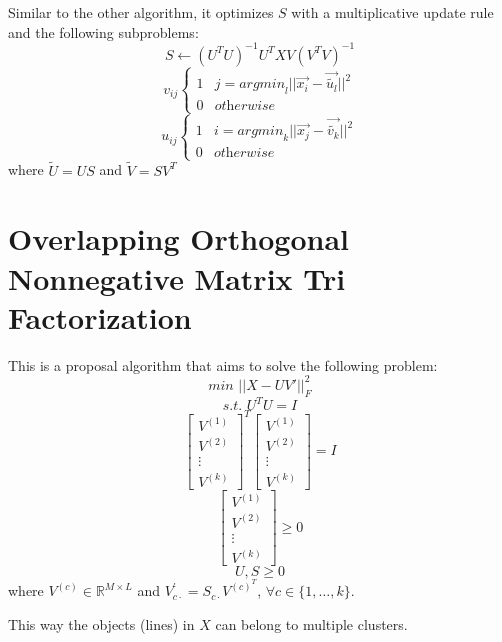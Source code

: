 \documentclass[paper=a4, fontsize=11pt]{scrartcl} %
\numberwithin{equation}{section} %
\numberwithin{figure}{section} %
\numberwithin{table}{section} %
\begin{document}
Similar to the other algorithm, it optimizes $S$ with a multiplicative update rule and the following subproblems:
$$S \gets (U^TU)^{-1}U^TXV(V^TV)^{-1}$$
$$v_{ij} \left\{
\begin{array}{ll}
        1 & j = \textit{argmin}_l ||\vec{x_i} - \vec{\tilde{u_l}}||^2 \\
        0 & \textit{otherwise}
    \end{array}
\right.$$
$$u_{ij} \left\{
\begin{array}{ll}
        1 & i = \textit{argmin}_k ||\vec{x_j} - \vec{\tilde{v_k}}||^2 \\
        0 & \textit{otherwise}
    \end{array}
\right.$$
where $\tilde{U} = US$ and $\tilde{V} = SV^T$


\section{Overlapping Orthogonal Nonnegative Matrix Tri Factorization}

This is a proposal algorithm that aims to solve the following problem:
$$\textit{min } ||X - UV'||^{2}_{F}$$
$$\textit{s.t. } U^TU = I$$
$$\left[ \begin{array}{c} V^{(1)} \\ V^{(2)} \\ \vdots \\ V^{(k)} \end{array} \right]^T\left[ \begin{array}{c} V^{(1)} \\ V^{(2)} \\ \vdots \\ V^{(k)} \end{array} \right] = I$$
$$\left[ \begin{array}{c} V^{(1)} \\ V^{(2)} \\ \vdots \\ V^{(k)} \end{array} \right] \geq 0$$
$$U, S \geq 0$$
where $V^{(c)} \in \mathbb{R}^{M \times L}$ and $V^{'}_{c \cdot} = S_{c \cdot} V^{(c)^T}$, $\forall c \in \{1, \dots, k\}$.

This way the objects (lines) in $X$ can belong to multiple clusters.
\end{document}
